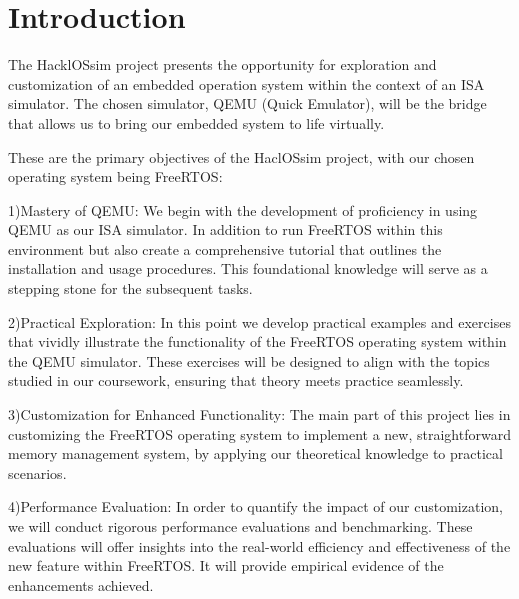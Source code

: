 \section{Introduction}
The HacklOSsim project presents the opportunity for exploration and customization of an embedded operation system within the context of an ISA simulator.
The chosen simulator, QEMU (Quick Emulator), will be the bridge that allows us to bring our embedded system to life virtually.

These are the primary objectives of the HaclOSsim project, with our chosen operating system being FreeRTOS:

 1)Mastery of QEMU: We begin with the development of proficiency in using QEMU as our ISA simulator. In addition to run FreeRTOS within this environment but also create a comprehensive tutorial that outlines the installation and usage procedures. This foundational knowledge will serve as a stepping stone for the subsequent tasks.
  
 2)Practical Exploration: In this point we develop practical examples and exercises that vividly illustrate the functionality of the FreeRTOS operating system within the QEMU simulator. These exercises will be designed to align with the topics studied in our coursework, ensuring that theory meets practice seamlessly.
  
 3)Customization for Enhanced Functionality: The main part of this project lies in customizing the FreeRTOS operating system to implement a new, straightforward memory management system, by applying our theoretical knowledge to practical scenarios.
  
 4)Performance Evaluation: In order to quantify the impact of our customization, we will conduct rigorous performance evaluations and benchmarking. These evaluations will offer insights into the real-world efficiency and effectiveness of the new feature within FreeRTOS. It will provide empirical evidence of the enhancements achieved.







